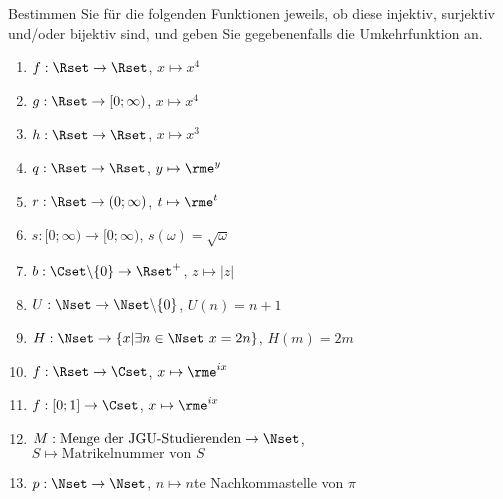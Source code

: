 
Bestimmen Sie für die folgenden Funktionen jeweils, ob diese injektiv, surjektiv und/oder bijektiv sind, und geben Sie gegebenenfalls die Umkehrfunktion an.\\
\parbox{0.4\textwidth}{\begin{enumerate}
\item $f:\Rset\to\Rset$, $x\mapsto x^4$
\item $g:\Rset\to[0;\infty)$, $x\mapsto x^4$
\item $h:\Rset\to\Rset$, $x\mapsto x^3$
\item $q:\Rset\to\Rset$, $y\mapsto \rme^y$
\item $r:\Rset\to(0;\infty)$, $t\mapsto \rme^t$
\item $s:[0;\infty)\to[0;\infty)$, $s(\omega)=\sqrt{\omega}$
\item $b:\Cset\backslash\{0\}\to\Rset^+$, $z\mapsto |z|$
\end{enumerate}}\parbox{0.6\textwidth}{\begin{enumerate}\setcounter{enumi}{7}
\item $U:\Nset\to\Nset\backslash\{0\}$, $U(n)=n+1$
\item $H:\Nset\to\{x|\exists n\in\Nset~x=2n\}$, $H(m)=2m$
\item $f:\Rset\to\Cset$, $x\mapsto\rme^{ix}$
\item $f:[0;1]\to\Cset$, $x\mapsto\rme^{ix}$
\item $M: {\textrm{Menge der JGU-Studierenden}}\to \Nset$,\\ $S\mapsto{\textrm{Matrikelnummer von }S}$
\item $p: \Nset\to\Nset$, $n\mapsto n$te Nachkommastelle von $\pi$
\end{enumerate}}




